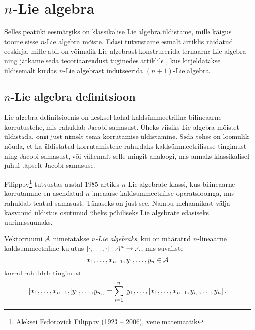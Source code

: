 

\section{\texorpdfstring{$n$}\ -Lie algebra}

Selles peatüki eesmärgiks on klassikalise Lie algebra
üldistame, mille käigus toome sisse $n$-Lie algebra mõiste.
Edasi tutvustame esmalt artiklis \cite{AMS:2011} näidatud eeskirja,
mille abil on võimalik Lie algebrast konstrueerida
ternaarne Lie algebra ning jätkame seda teooriaarendust
tuginedes artiklile \cite{AKMS:2014}, kus kirjeldatakse
üldisemalt kuidas $n$-Lie algebrast indutseerida $(n+1)$-Lie
algebra.

\subsection{\texorpdfstring{$n$}\ -Lie algebra definitsioon}

Lie algebra definitsioonis on kesksel kohal kaldsümmeetriline
bilineaarne korrutustehe, mis rahuldab Jacobi samasust.
Üheks viisiks Lie algebra mõistet üldistada, ongi just nimelt
tema korrutamise üldistamine. Seda tehes on loomulik nõuda, et
ka üldistatud korrutamistehe rahuldaks kaldsümmeetrilisuse
tingimust ning Jacobi samasust, või vähemalt selle mingit
analoogi, mis annaks klassikalisel juhul täpselt
Jacobi samasuse.

Filippov\footnote{Aleksei Fedorovich Filippov (1923 -- 2006),
vene matemaatik} tutvustas aastal 1985 artikis \cite{filippov1985}
$n$-Lie algebrate klassi, kus bilineaarne korrutamine on
asendatud $n$-lineaarse kaldsümmeetrilise operatsiooniga,
mis rahuldab teatud samasust.\cite{kasymov1987}
Tänaseks on just see, Nambu mehaanikast välja kasvanud
üldistus osutunud üheks põhiliseks Lie algebrate edasiseks
uurimissuunaks.

\begin{dfn}
    Vektorruumi $\mathcal{A}$ nimetatakse \emph{$n$-Lie algebraks}, kui
    on määratud $n$-lineaarne kaldsümmeetriline kujutus
    $\left[ \cdot, \dots, \cdot \right] \colon \mathcal{A}^n \to \mathcal{A}$, mis
    suvaliste
    \[ x_1, \dots, x_{n-1}, y_1, \dots, y_n \in \mathcal{A} \]
    korral rahuldab tingimust
    \begin{align}\label{id:filippov}
        \left[ x_1, \dots, x_{n-1}, \left[ y_1, \dots, y_n \right] \right] =
        \sum_{i=1}^n \left[
            y_1, \dots, \left[ x_1, \dots, x_{n-1}, y_i \right], \dots, y_n
        \right].
    \end{align}
\end{dfn}

